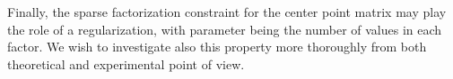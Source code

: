 Finally, the sparse factorization constraint for the \kmeans center point matrix may play the role of a regularization, with parameter being the number of values in each factor. 
We wish to investigate also this property more thoroughly from both theoretical and experimental point of view.

